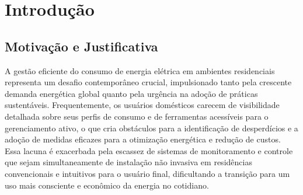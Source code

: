 \chapter{Introdução}
\label{chap:intro} %





\section{Motivação e Justificativa}
\label{sec:motivacao}

A gestão eficiente do consumo de energia elétrica em ambientes residenciais representa um desafio contemporâneo crucial, impulsionado tanto pela crescente demanda energética global quanto pela urgência na adoção de práticas sustentáveis. Frequentemente, os usuários domésticos carecem de visibilidade detalhada sobre seus perfis de consumo e de ferramentas acessíveis para o gerenciamento ativo, o que cria obstáculos para a identificação de desperdícios e a adoção de medidas eficazes para a otimização energética e redução de custos. Essa lacuna é exacerbada pela escassez de sistemas de monitoramento e controle que sejam simultaneamente de instalação não invasiva em residências convencionais e intuitivos para o usuário final, dificultando a transição para um uso mais consciente e econômico da energia no cotidiano.

